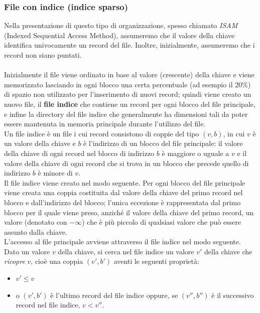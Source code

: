 \subsubsection{File con indice (indice sparso)}
Nella presentazione di questo tipo di organizzazione, spesso chiamato \emph{ISAM} (Indexed Sequential
Access Method), assumeremo che il valore della chiave identifica univocamente un record del file.
Inoltre, inizialmente, assumeremo che i record non siano puntati.\\\\
Inizialmente il file viene ordinato in base al valore (crescente) della chiave e viene memorizzato
lasciando in ogni blocco una certa percentuale (ad esempio il 20\%) di spazio non utilizzato per
l'inserimento di nuovi record; quindi viene creato un nuovo file, il \textbf{file indice} che
contiene un record per ogni blocco del file principale, e infine la directory del file indice che 
generalmente ha dimensioni tali da poter essere mantenuta in memoria principale durante l'utilizzo del file.\\
Un file indice è un file i cui record consistono di coppie del tipo $(v, b)$, in cui $v$ è un valore della
chiave e $b$ è l'indirizzo di un blocco del file principale: il valore della chiave di ogni record nel
blocco di indirizzo $b$ è maggiore o uguale a $v$ e il valore della chiave di ogni record che si trova in
un blocco che precede quello di indirizzo $b$ è minore di $v$.\\
Il file indice viene creato nel modo seguente. Per ogni blocco del file principale viene creata una
coppia costituita dal valore della chiave del primo record nel blocco e dall'indirizzo del blocco;
l'unica eccezione è rappresentata dal primo blocco per il quale viene preso, anziché il valore della
chiave del primo record, un valore (denotato con $-\infty$) che è più piccolo di qualsiasi valore che può
essere assunto dalla chiave.\\
L'accesso al file principale avviene attraverso il file indice nel modo seguente. Dato un valore $v$
della chiave, si cerca nel file indice un valore $v'$ della chiave che \emph{ricopre} $v$, cioè una coppia 
$(v', b')$ aventi le seguenti proprietà:
\begin{itemize}
 \item $v' \leq v$
 \item o $(v', b')$ è l'ultimo record del file indice oppure, se $(v'', b'')$ è il successivo record 
 nel file indice, $v<v''$.
\end{itemize}

